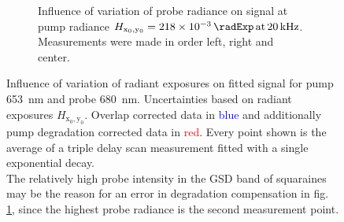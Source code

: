 \documentclass[twoside,openright,listof=numbered]{scrreprt}
\def\frep#1{\ensuremath{\,\mathrm{at}\, \SI{#1}{\kilo\hertz}}}
\def\radiantExp{\ensuremath{H_\mathrm{x_0,y_0}}}
\begin{document}
\begin{figure}[p]
\begin{subfigure}[t]{0.5\linewidth}
\caption{Influence of variation of probe radiance on signal at pump radiance $\radiantExp=\SI{218e-3}{\radExp}\frep{20}$. Measurements were made in order left, right and center.\label{fig:PowerVarProbe}}
\end{subfigure}
\caption[Influence of variation of radiant exposures on signal for pump \SI{653}{\nano\meter} and probe \SI{680}{\nano\meter}.]{Influence of variation of radiant exposures on fitted signal for pump \SI{653}{\nano\meter} and probe \SI{680}{\nano\meter}. Uncertainties based on radiant exposures $\radiantExp$.
Overlap corrected data in \textcolor{blue}{blue} and additionally pump degradation corrected data in \textcolor{red}{red}. Every point shown is the average of a triple delay scan measurement fitted with a single exponential decay.\\ The relatively high probe intensity in the GSD band of squaraines may be the reason for an error in degradation compensation in fig. \ref{fig:PowerVarProbe}, since the highest probe radiance is the second measurement point. \label{fig:PowerVarRaw}}
\end{figure}
\end{document}
